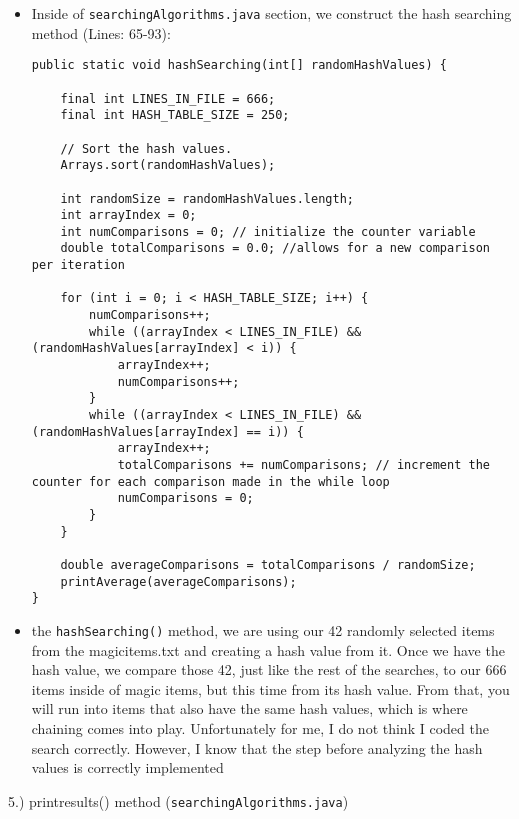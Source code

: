 \documentclass{article}
\begin{document}
\begin{itemize}
\item Inside of \verb|searchingAlgorithms.java| section, we construct the hash searching method (Lines: 65-93):

\begin{verbatim}
public static void hashSearching(int[] randomHashValues) {

    final int LINES_IN_FILE = 666;
    final int HASH_TABLE_SIZE = 250;
    
    // Sort the hash values.
    Arrays.sort(randomHashValues);
    
    int randomSize = randomHashValues.length;
    int arrayIndex = 0;
    int numComparisons = 0; // initialize the counter variable
    double totalComparisons = 0.0; //allows for a new comparison per iteration
    
    for (int i = 0; i < HASH_TABLE_SIZE; i++) {
        numComparisons++;
        while ((arrayIndex < LINES_IN_FILE) && (randomHashValues[arrayIndex] < i)) { 
            arrayIndex++;
            numComparisons++;
        }
        while ((arrayIndex < LINES_IN_FILE) && (randomHashValues[arrayIndex] == i)) {
            arrayIndex++;
            totalComparisons += numComparisons; // increment the counter for each comparison made in the while loop
            numComparisons = 0;
        }
    }
    
    double averageComparisons = totalComparisons / randomSize;
    printAverage(averageComparisons);
}
\end{verbatim}
\item the \verb|hashSearching()| method, we are using our 42 randomly selected items from the magicitems.txt and creating a hash value from it. Once we have the hash value, we compare those 42, just like the rest of the searches, to our 666 items inside of magic items, but this time from its hash value. From that, you will run into items that also have the same hash values, which is where chaining comes into play. Unfortunately for me, I do not think I coded the search correctly. However, I know that the step before analyzing the hash values is correctly implemented\\

\end{itemize}

\pagebreak

\begin{large}
    5.) printresults() method (\verb|searchingAlgorithms.java|)
\end{large}
\end{document}
